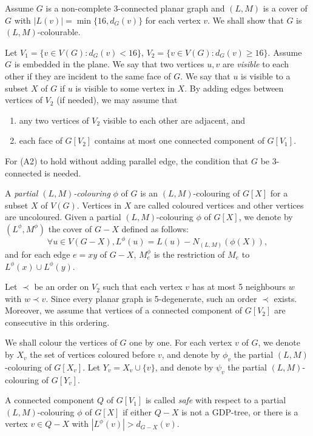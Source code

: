 \documentclass[11pt,a4paper]{article}
\theoremstyle{definition}
\begin{document}
Assume $G$ is a non-complete 3-connected planar graph  and $(L,M)$ is a cover of $G$ with $|L(v)| =  \min \{16, d_G(v)\}$ for each vertex $v$.   
We shall show that $G$ is $(L,M)$-colourable.

Let $V_1=\{v \in V(G): d_G(v) < 16\}$, $  V_2 = \{v \in V(G): d_G(v) \ge 16\}$. Assume $G$ is embedded in the plane. 
We say that two vertices $u,v$ are {\em visible} to each other if they are incident to the same face of $G$. We say that $u$ is visible to a subset $X$ of $G$ if $u$ is visible to some vertex in $X$. By adding edges between vertices of $V_2$ (if needed), we may assume that 
\begin{enumerate}
    \item[(A1)] any two vertices of $V_2$ visible to each other are adjacent,
     and 
     \item[(A2)] each face of $G[V_2]$ contains at most one connected component of $G[V_1]$.
\end{enumerate} 

For (A2) to hold without adding parallel edge, the condition that $G$ be 3-connected is needed.




 
A \emph{partial $(L,M)$-colouring} $\phi$ of $G$ is an $(L,M)$-colouring of $G[X]$ for a subset $X$ of $V(G)$. Vertices in $X$ are called coloured vertices and other vertices are uncoloured. Given a partial $(L,M)$-colouring  $\phi$   of $G[X]$, we denote by $(L^{\phi}, M^{\phi})$ the cover
of $G-X$ defined as follows:
$$\forall u \in V(G-X), L^{\phi}(u)=L(u)-N_{(L,M)}(\phi(X)),$$
and for each edge $e=xy$ of $G-X$, $M^{\phi}_e$ is the restriction of $M_e$ to $L^{\phi}(x) \cup L^{\phi}(y)$. 

  Let $\prec$ be an order on  $V_2$ such that each vertex $v$ has at most 5 neighbours $w$ with $w \prec v$.  Since every planar graph is 5-degenerate, such an order $\prec$ exists. Moreover, we assume that vertices of a connected component of $G[V_2]$ are consecutive in this ordering.
 
  We shall colour the vertices of $G$ one by one. For each vertex $v$ of $G$, we denote by $X_v$ the set of vertices coloured before $v$, and denote by $\phi_v$ the partial $(L,M)$-colouring of $G[X_v]$.
Let $Y_v = X_v \cup \{v\}$, and denote by $\psi_v$ the partial $(L,M)$-colouring of $G[Y_v]$. 


A connected component $Q$ of $G[V_1]$ is called {\em safe} with respect to a partial $(L,M)$-colouring $\phi$ of $G[X]$ if either $Q-X$ is not a GDP-tree, or there is a vertex $v \in Q-X$ with $|L^{\phi}(v)| > d_{G-X}(v)$. 
\end{document}
